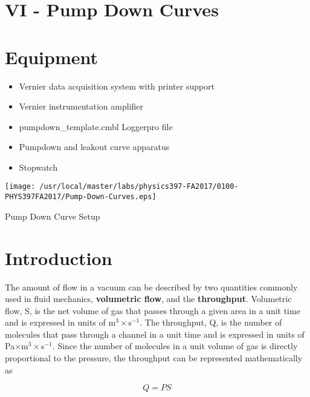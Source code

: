 \section{VI - Pump Down Curves}

\section{Equipment}

\begin{minipage}[t]{0.5\textwidth}
\begin{itemize}[noitemsep]
\item Vernier data acquisition system with printer support
\item Vernier instrumentation amplifier
\item pumpdown\_template.cmbl Loggerpro file
\end{itemize}
\end{minipage}
\begin{minipage}[t]{0.5\textwidth}
\begin{itemize}[noitemsep]
\item Pumpdown and leakout curve apparatus
\item Stopwatch
\end{itemize}
\end{minipage}

\begin{marginfigure}
\texttt{[image: /usr/local/master/labs/physics397-FA2017/0100-PHYS397FA2017/Pump-Down-Curves.eps]}
\caption{Pump Down Curve Setup}
\label{fig:VACsetup6}
\end{marginfigure}

\section{Introduction}

The amount of flow in a vacuum can be described by two quantities commonly used in fluid mechanics, {\bf volumetric flow}, and the {\bf throughput}. Volumetric flow, S, is the net volume of gas that passes through a given area in a unit time and is expressed in units of m$^3\times$s$^{-1}$. The throughput, Q, is the number of molecules that pass through a channel in a unit time and is expressed in units of Pa$\times$m$^3\times$s$^{-1}$. Since the number of molecules in a unit volume of gas is directly proportional to the pressure, the throughput can be represented mathematically as

\begin{equation}
Q=PS
\label{equ:vac1}
\end{equation}

